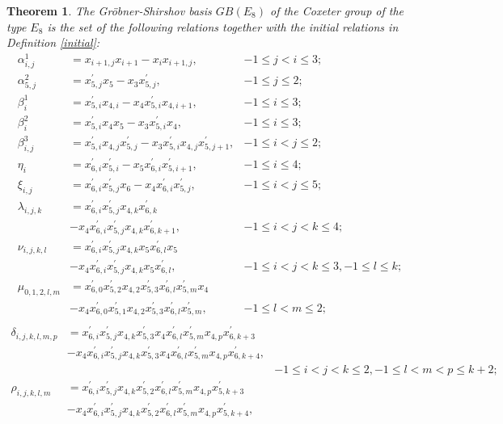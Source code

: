 \documentclass[UTF8]{amsart}
\newtheorem{theorem}[tpcl]{Theorem}
\theoremstyle{definition}
\theoremstyle{remark}
\numberwithin{equation}{section}
\begin{document}
\begin{theorem}
The Gr\"{o}bner-Shirshov basis $GB(E_8)$ of the Coxeter group of the type $E_8$ is the set of the following relations  together with the initial relations in Definition \ref{initial}:
\begin{align*}
\alpha_{i,j}^1&=x_{i+1,j}x_{i+1}-x_ix_{i+1,j}, &-1\leq j<i\leq3;\\
\alpha_{5,j}^2&=x_{5,j}^{'}x_5-x_3x_{5,j}^{'} ,&-1\leq j\leq 2;\\
\beta_i^1&=x_{5,i}^{'}x_{4,i}-x_4x_{5,i}^{'}x_{4,i+1}, &-1\leq i\leq3;\\
\beta_i^2&=x_{5,i}^{'}x_4x_5-x_3x_{5,i}^{'}x_4 , &-1\leq i\leq3;\\
\beta_{i,j}^3&=x_{5,i}^{'}x_{4,j}x_{5,j}^{'}-x_3x_{5,i}^{'}x_{4,j}x_{5,j+1}^{'} ,&-1\leq i<j\leq2;\\
\eta_i&=x_{6,i}^{'}x_{5,i}^{'}-x_5x_{6,i}^{'}x_{5,i+1}^{'}, &-1\leq i\leq4;\\
\xi_{i,j}&=x_{6,i}^{'}x_{5,j}^{'}x_6-x_4x_{6,i}^{'}x_{5,j}^{'} ,&-1\leq i<j\leq5;\\
\lambda_{i,j,k}&=x_{6,i}^{'}x_{5,j}^{'}x_{4,k}x_{6,k}^{'}&\\
         &-x_4x_{6,i}^{'}x_{5,j}^{'}x_{4,k}x_{6,k+1}^{'} ,&-1\leq i<j<k\leq4;\\
\nu_{i,j,k,l}&=x_{6,i}^{'}x_{5,j}^{'}x_{4,k}x_5x_{6,l}^{'}x_5& \\
        &-x_4x_{6,i}^{'}x_{5,j}^{'}x_{4,k}x_5x_{6,l}^{'} ,&-1\leq i<j<k\leq3,-1\leq l\leq k;\\
\mu_{0,1,2,l,m}&=x_{6,0}^{'}x_{5,2}^{'}x_{4,2}x_{5,3}^{'}x_{6,l}^{'}x_{5,m}^{'}x_{4}&\\
         &-x_4x_{6,0}^{'}x_{5,1}^{'}x_{4,2}x_{5,3}^{'}x_{6,l}^{'}x_{5,m}^{'}, &-1\leq l<m\leq 2;\\
\end{align*}
\begin{align*}
\delta_{i,j,k,l,m,p}&=x_{6,i}^{'}x_{5,j}^{'}x_{4,k}x_{5,3}^{'}x_4x_{6,l}^{'}x_{5,m}^{'}x_{4,p}x_{6,k+3}^{'} &\\
          &-x_4x_{6,i}^{'}x_{5,j}^{'}x_{4,k}x_{5,3}^{'}x_4x_{6,l}^{'}x_{5,m}^{'}x_{4,p}x_{6,k+4}^{'},& \\
          &&-1\leq i<j<k\leq 2,-1\leq l<m<p\leq k+2;\\
\rho_{i,j,k,l,m}&=x_{6,i}^{'}x_{5,j}^{'}x_{4,k}x_{5,2}^{'}x_{6,l}^{'}x_{5,m}^{'}x_{4,p}x_{5,k+3}^{'} &\\
          &-x_4x_{6,i}^{'}x_{5,j}^{'}x_{4,k}x_{5,2}^{'}x_{6,l}^{'}x_{5,m}^{'}x_{4,p}x_{5,k+4}^{'},& \\

\end{align*}
\end{theorem}
\end{document}
